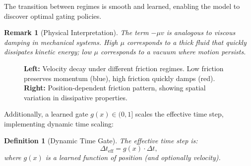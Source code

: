 \documentclass[12pt,letterpaper,twoside]{article}
\newtheorem{definition}{Definition}[section]
\newtheorem{remarque}{Remark}[section]
\begin{document}
The transition between regimes is smooth and learned, enabling the model to discover optimal gating policies.

\begin{remarque}[Physical Interpretation]
The term $-\mu v$ is analogous to viscous damping in mechanical systems. High $\mu$ corresponds to a thick fluid that quickly dissipates kinetic energy; low $\mu$ corresponds to a vacuum where motion persists.
\end{remarque}

\begin{figure}[htbp]
\centering
{}
\hfill
{}
\caption{\textbf{Left:} Velocity decay under different friction regimes. Low friction preserves momentum (blue), high friction quickly damps (red). \textbf{Right:} Position-dependent friction pattern, showing spatial variation in dissipative properties.}
\label{fig:friction-dynamics}
\end{figure}

Additionally, a learned gate $g(x) \in (0,1]$ scales the effective time step, implementing dynamic time scaling:

\begin{definition}[Dynamic Time Gate]
The effective time step is:
\[
\Delta t_{\text{eff}} = g(x) \cdot \Delta t,
\]
where $g(x)$ is a learned function of position (and optionally velocity).
\end{definition}
\end{document}
